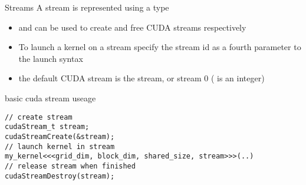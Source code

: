 \begin{frame}[fragile]{Streams}
    A stream is represented using a  type
    \begin{itemize}
        \item {} and  can be used to create and free CUDA streams respectively
        \item To launch a kernel on a stream specify the stream id as a fourth parameter to the launch syntax \\
            \begin{center}  \end{center}
        \item the default CUDA stream is the  stream, or stream 0 ( is an integer)
    \end{itemize}

    \begin{code}{basic cuda stream useage}
        \begin{lstlisting}[style=boxcudatiny]
// create stream
cudaStream_t stream;
cudaStreamCreate(&stream);
// launch kernel in stream
my_kernel<<<grid_dim, block_dim, shared_size, stream>>>(..)
// release stream when finished
cudaStreamDestroy(stream);
        \end{lstlisting}
\end{code}

\end{frame}

